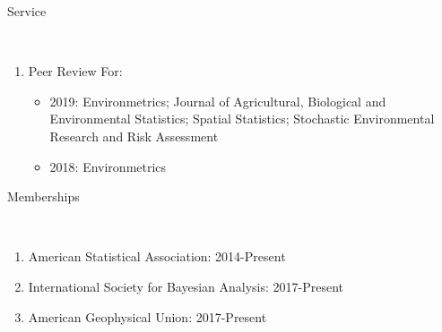\documentclass[11pt]{article}
\newcommand{\head}[1]{ %
    \bigskip %
    \begin{large}\begin{bf}{#1}\end{bf}\end{large} %

    \ \\ [-1.3cm] %

    \hrulefill}
\begin{document}
\head{Service}
\begin{enumerate}[label=$\bullet$]
\item Peer Review For:
\begin{itemize}
\item 2019: Environmetrics; Journal of Agricultural, Biological and Environmental Statistics; Spatial Statistics; Stochastic Environmental Research and Risk Assessment 
\item 2018: Environmetrics 
\end{itemize}  
\end{enumerate}


\head{Memberships}

\begin{enumerate}[label=$\bullet$]
\item American Statistical Association: 2014-Present
\item International Society for Bayesian Analysis: 2017-Present
\item American Geophysical Union: 2017-Present
\end{enumerate}



\end{document}

